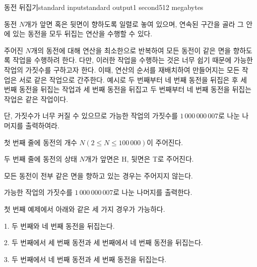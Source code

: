 \begin{problem}{동전 뒤집기}{standard input}{standard output}{1 second}{512 megabytes}

동전 $N$개가 앞면 혹은 뒷면이 향하도록 일렬로 놓여 있으며, 연속된 구간을 골라 그 안에 있는 동전을 모두 뒤집는 연산을 수행할 수 있다. 

주어진 $N$개의 동전에 대해 연산을 최소한으로 반복하여 모든 동전이 같은 면을 향하도록 작업을 수행하려 한다. 다만, 이러한 작업을 수행하는 것은 너무 쉽기 때문에 가능한 작업의 가짓수를 구하고자 한다. 이때, 연산의 순서를 재배치하여 만들어지는 모든 작업은 서로 같은 작업으로 간주한다. 예시로 두 번째부터 네 번째 동전을 뒤집은 후 세 번째 동전을 뒤집는 작업과 세 번째 동전을 뒤집고 두 번째부터 네 번째 동전을 뒤집는 작업은 같은 작업이다.

단, 가짓수가 너무 커질 수 있으므로 가능한 작업의 가짓수를 $1\,000\,000\,007$로 나눈 나머지를 출력하여라.


\InputFile
첫 번째 줄에 동전의 개수 $N(2 \le N \le 100\,000)$이 주어진다.

두 번째 줄에 동전의 상태 $N$개가 앞면은 H, 뒷면은 T로 주어진다.

모든 동전이 전부 같은 면을 향하고 있는 경우는 주어지지 않는다.

\OutputFile
가능한 작업의 가짓수를 $1\,000\,000\,007$로 나눈 나머지를 출력한다.

\Examples

\begin{example}
%
%
\end{example}

\Note
첫 번째 예제에서 아래와 같은 세 가지 경우가 가능하다.

1. 두 번째와 네 번째 동전을 뒤집는다.

2. 두 번째에서 세 번째 동전과 세 번째에서 네 번째 동전을 뒤집는다.

3. 두 번째에서 네 번째 동전과 세 번째 동전을 뒤집는다.

\end{problem}